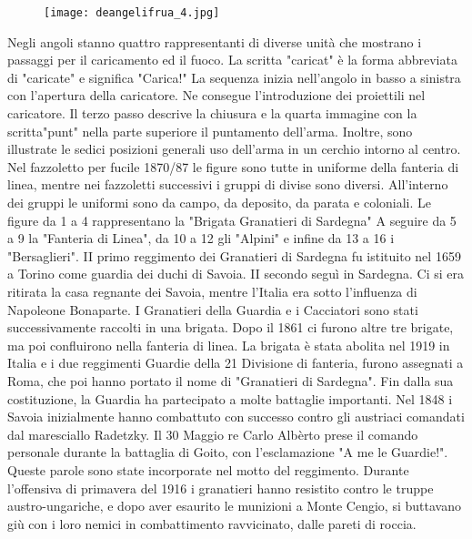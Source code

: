 \newpage

\begin{figure}[h]
	\centering
		\texttt{[image: deangelifrua\_4.jpg]}
	\caption{}
	\label{fig:deangelifrua_4}
\end{figure}

\newpage

Negli angoli stanno quattro rappresentanti di diverse unità che mostrano i passaggi per il caricamento ed il fuoco. La scritta "caricat" è la forma abbreviata di "caricate" e significa "Carica!" La sequenza inizia nell'angolo in basso a sinistra con l'apertura della caricatore. Ne consegue l'introduzione dei proiettili nel caricatore. Il terzo passo descrive la chiusura e la quarta immagine con la scritta"punt" nella parte superiore il puntamento dell'arma.
   Inoltre, sono illustrate le sedici posizioni generali uso dell'arma in un cerchio intorno al centro. Nel fazzoletto per fucile 1870/87 le figure sono tutte in uniforme della fanteria di linea, mentre nei fazzoletti successivi i gruppi di divise sono diversi. All'interno dei gruppi le uniformi sono da campo, da deposito, da parata e coloniali. Le figure da 1 a 4 rappresentano la "Brigata Granatieri di Sardegna" A seguire da 5 a 9 la "Fanteria di Linea", da 10 a 12 gli "Alpini" e infine da 13 a 16 i "Bersaglieri".
II primo reggimento dei Granatieri di Sardegna  fu istituito nel 1659 a Torino come guardia dei duchi di Savoia. 
   II secondo seguì in Sardegna. Ci si era ritirata la casa regnante dei Savoia, mentre l'Italia era sotto l'influenza di Napoleone Bonaparte. I Granatieri della Guardia e i Cacciatori sono stati successivamente raccolti in una brigata. Dopo il 1861 ci furono altre tre brigate, ma poi confluirono nella fanteria di linea. La brigata è stata abolita nel 1919 in Italia e i due reggimenti Guardie della 21 Divisione di fanteria, furono assegnati a Roma, che poi hanno portato il nome di "Granatieri di Sardegna".
   Fin dalla sua costituzione, la Guardia ha partecipato a molte battaglie importanti. Nel 1848 i Savoia inizialmente hanno combattuto con successo contro gli austriaci comandati dal maresciallo Radetzky. Il 30 Maggio re Carlo Albèrto prese il comando personale durante la battaglia di Goito, con l'esclamazione "A me le Guardie!". Queste parole sono state incorporate nel motto del reggimento. Durante l'offensiva di primavera del 1916 i granatieri hanno resistito contro le truppe austro-ungariche, e dopo aver esaurito le munizioni a Monte Cengio, si buttavano giù con i loro nemici in combattimento ravvicinato, dalle pareti di roccia.
